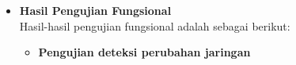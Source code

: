 \documentclass[a4paper,twoside]{article}
\begin{document}
\begin{enumerate}
\begin{itemize}
{\begin{itemize}
{                        \begin{itemize}
                            \item{Deteksi perubahan jaringan.}
                            \item{Deteksi \textit{captive portal}.}
                            \item{Login otomatis.}
                        \end{itemize}

                        Setiap fungsi yang diuji diberikan kasus pengujian positif dan pengujian negatif.
                    }
                    \item{
                        {\bf Hasil Pengujian Fungsional}\\
                        Hasil-hasil pengujian fungsional adalah sebagai berikut:

                        \begin{itemize}
                            \item{
                                \textbf{Pengujian deteksi perubahan jaringan}
                                
}
\end{itemize}}
\end{itemize}}
\end{itemize}
\end{enumerate}
\end{document}
